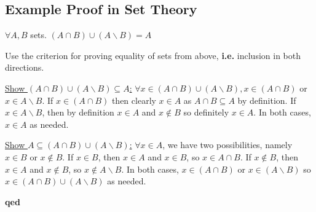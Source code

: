 \documentclass[10pt]{article}
\begin{document}
	\subsection{Example Proof in Set Theory}
	\begin{description}
		\item[Proposition:] $\forall A, B$ sets. $(A \cap B) \cup (A \backslash B) = A$
		\item[Proof:] Use the criterion for proving equality of sets from above, \textbf{i.e.} inclusion in both directions.
		\item \underline{Show $(A \cap B) \cup (A \backslash B) \subseteq A$:} $\forall x \in (A \cap B) \cup (A \backslash B), x \in (A \cap B)$ or $x \in A \backslash B$. If $x \in (A \cap B)$ then clearly $x \in A$ as $A \cap B \subseteq A$ by definition. If $x \in A \backslash B$, then by definition $x \in A$ and $x \notin B$ so definitely $x \in A$. In both cases, $x \in A$ as needed.
		\item \underline{Show $A \subseteq (A \cap B) \cup (A \backslash B)$:} $\forall x \in A$, we have two possibilities, namely $x \in B$ or $x \notin B$. If $x \in B$, then $x \in A$ and $x \in B$, so $x \in A \cap B$. If $x \notin B$, then $x \in A$ and $x \notin B$, so $x \notin A \backslash B$. In both cases, $x \in (A \cap B)$ or $x \in (A \backslash B)$ so $x \in (A \cap B) \cup (A \backslash B)$ as needed.
		\item \textbf{qed}
	\end{description}
	
\end{document}
